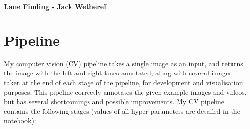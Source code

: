 \documentclass[letterpaper,12pt]{article}
\begin{document}
\title{}
\author{}
\date{}
%


\begin{center}
\textbf{Lane Finding - Jack Wetherell} \\
\end{center}


\section{Pipeline}
My computer vision (CV) pipeline takes a single image as an input, and returns the image with the left and right lanes annotated, along with several images taken at the end of each stage of the pipeline, for development and visualisation purposes. This pipeline correctly annotates the given example images and videos, but has several shortcomings and possible improvements. My CV pipeline contains the following stages (values of all hyper-parameters are detailed in the notebook):
\end{document}
